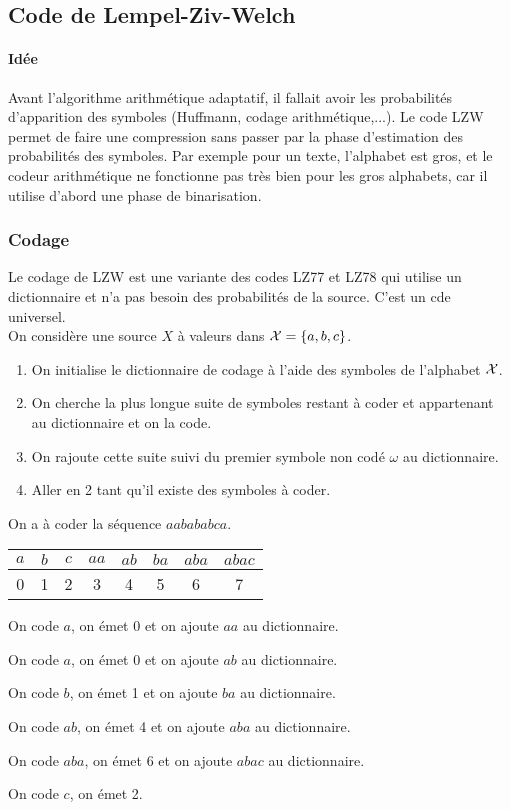 \documentclass[main.tex]{subfiles}
\begin{document}
\subsection{Code de Lempel-Ziv-Welch}

\paragraph{Idée}
Avant l'algorithme arithmétique adaptatif, il fallait avoir les probabilités d'apparition des symboles (Huffmann, codage arithmétique,...). Le code LZW permet de faire une compression sans passer par la phase d'estimation des probabilités des symboles. Par exemple pour un texte, l'alphabet est gros, et le codeur arithmétique ne fonctionne pas très bien pour les gros alphabets, car il utilise d'abord une phase de binarisation.\\

\subsubsection{Codage}
Le codage de LZW est une variante des codes LZ77 et LZ78 qui utilise un dictionnaire et n'a pas besoin des probabilités de la source. C'est un cde universel.\\

On considère une source $X$ à valeurs dans $\mathcal{X}=\{a,b,c\}$.

\begin{enumerate}
\item On initialise le dictionnaire de codage à l'aide des symboles de l'alphabet $\mathcal{X}$.
\item On cherche la plus longue suite de symboles restant à coder et appartenant au dictionnaire et on la code.
\item On rajoute cette suite suivi du premier symbole non codé $\omega$ au dictionnaire.
\item Aller en 2 tant qu'il existe des symboles à coder.
\end{enumerate}

\begin{exemple}
On a à coder la séquence $aabababca$.

\begin{center}
\begin{tabular}{|c|c|c|c|c|c|c|c|}
\hline
$a$ & $b$ & $c$ & $aa$ & $ab$ & $ba$ & $aba$ & $abac$ \\
\hline
0 & 1 & 2 & 3 & 4 & 5 & 6 & 7\\
\hline
\end{tabular}
\end{center}

On code $a$, on émet 0 et on ajoute $aa$ au dictionnaire.

On code $a$, on émet 0 et on ajoute $ab$ au dictionnaire.

On code $b$, on émet 1 et on ajoute $ba$ au dictionnaire.

On code $ab$, on émet 4 et on ajoute $aba$ au dictionnaire.

On code $aba$, on émet 6 et on ajoute $abac$ au dictionnaire.

On code $c$, on émet 2.

\end{exemple}
\end{document}
